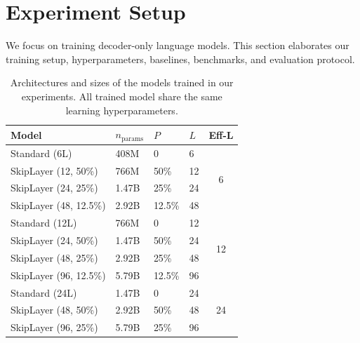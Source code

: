 \documentclass{article}
\begin{document}
\section{Experiment Setup}
We focus on training decoder-only language models. This section elaborates our training setup, hyperparameters, baselines, benchmarks, and evaluation protocol.


\begin{table}[t]
\centering
\caption{Architectures and sizes of the models trained in our experiments. All trained model share the same learning hyperparameters.}
\begin{tabular}{llllc}
\toprule
Model      & $n_{\text{params}}$ & $P$ &  $L$ & Eff-L \\ \midrule
Standard (6L)     & 408M      & 0     & 6 & \multirow{4}{*}{6} \\
SkipLayer (12, 50\%) & 766M      & 50\%   & 12 & \\
SkipLayer (24, 25\%) & 1.47B      & 25\%   & 24 & \\
SkipLayer (48, 12.5\%) & 2.92B      & 12.5\%   & 48 & \\
\midrule
Standard (12L)     & 766M      & 0     & 12  & \multirow{4}{*}{12} \\
SkipLayer (24, 50\%) & 1.47B      & 50\%   & 24 & \\
SkipLayer (48, 25\%) & 2.92B      & 25\%   & 48 & \\
SkipLayer (96, 12.5\%) & 5.79B      & 12.5\%   & 96 & \\
\midrule
Standard (24L)     & 1.47B      & 0     & 24  & \multirow{3}{*}{24} \\
SkipLayer (48, 50\%) & 2.92B      & 50\%   & 48 & \\
SkipLayer (96, 25\%) & 5.79B      & 25\%   & 96 & \\
\bottomrule
\end{tabular}
\label{table:model_setup}
\end{table}
\end{document}
